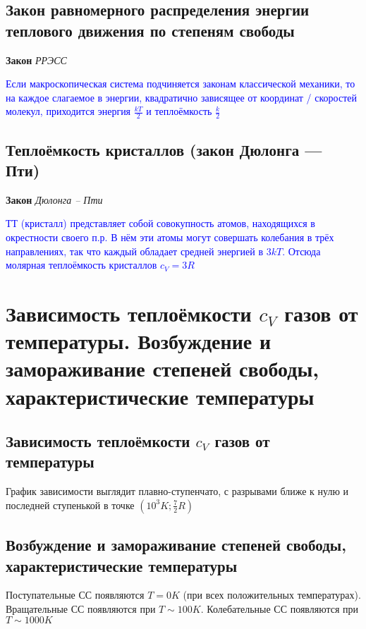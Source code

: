 \documentclass[a4paper, 14pt]{article}
\begin{document}
    \subsection{Закон равномерного распределения энергии теплового движения по степеням свободы}
    
    \textbf{Закон} \textit{РРЭСС}
    
    \textcolor{blue}{Если макроскопическая система подчиняется законам классической механики, то на каждое слагаемое
    в энергии, квадратично зависящее от координат / скоростей молекул, приходится энергия $\frac{kT}{2}$ и
    теплоёмкость $\frac{k}{2}$}
    
    \subsection{Теплоёмкость кристаллов (закон Дюлонга — Пти)}
    
    \textbf{Закон} \textit{Дюлонга -- Пти}
    
    \textcolor{blue}{ТТ (кристалл) представляет собой совокупность атомов, находящихся в окрестности своего п.р.
    В нём эти атомы могут совершать колебания в трёх направлениях, так что каждый обладает средней энергией в $3kT$.
    Отсюда молярная теплоёмкость кристаллов $c_V = 3R$}
    
    \section{Зависимость теплоёмкости $c_V$ газов от температуры.
    Возбуждение и замораживание степеней свободы, характеристические температуры}
    
    \subsection{Зависимость теплоёмкости $c_V$ газов от температуры}
    
    График зависимости выглядит плавно-ступенчато, с разрывами ближе к нулю и последней ступенькой в точке
    $(10^3 K; \frac{7}{2}R)$
    
    \subsection{Возбуждение и замораживание степеней свободы, характеристические температуры}
    
    Поступательные СС появляются $T = 0 K$ (при всех положительных температурах).
    Вращательные СС появляются при $T \sim 100 K$.
    Колебательные СС появляются при $T \sim 1000 K$
    
\end{document}
